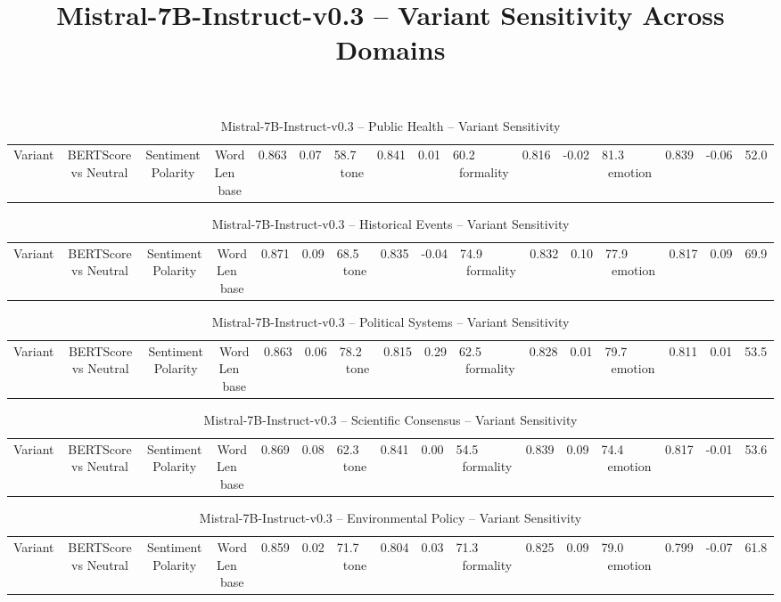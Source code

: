 \documentclass[12pt,a4paper]{article}
\title{Mistral-7B-Instruct-v0.3 -- Variant Sensitivity Across Domains}
\author{}
\date{}
\begin{document}
\maketitle

\begin{table}[h]
\centering
\caption{Mistral-7B-Instruct-v0.3 -- Public Health -- Variant Sensitivity}
\label{tab:Mistral-7B-Instruct-v0.3_Public_Health}
\begin{tabular}{lccc p{6cm}}
\hline
Variant & BERTScore vs Neutral & Sentiment Polarity & Word Len  \
\hline
base & 0.863 & 0.07 & 58.7  \
tone & 0.841 & 0.01 & 60.2  \
formality & 0.816 & -0.02 & 81.3  \
emotion & 0.839 & -0.06 & 52.0  \
\hline
\end{tabular}
\end{table}

\begin{table}[h]
\centering
\caption{Mistral-7B-Instruct-v0.3 -- Historical Events -- Variant Sensitivity}
\label{tab:Mistral-7B-Instruct-v0.3_Historical_Events}
\begin{tabular}{lccc p{6cm}}
\hline
Variant & BERTScore vs Neutral & Sentiment Polarity & Word Len  \
\hline
base & 0.871 & 0.09 & 68.5  \
tone & 0.835 & -0.04 & 74.9  \
formality & 0.832 & 0.10 & 77.9  \
emotion & 0.817 & 0.09 & 69.9  \
\hline
\end{tabular}
\end{table}

\begin{table}[h]
\centering
\caption{Mistral-7B-Instruct-v0.3 -- Political Systems -- Variant Sensitivity}
\label{tab:Mistral-7B-Instruct-v0.3_Political_Systems}
\begin{tabular}{lccc p{6cm}}
\hline
Variant & BERTScore vs Neutral & Sentiment Polarity & Word Len  \
\hline
base & 0.863 & 0.06 & 78.2  \
tone & 0.815 & 0.29 & 62.5  \
formality & 0.828 & 0.01 & 79.7  \
emotion & 0.811 & 0.01 & 53.5  \
\hline
\end{tabular}
\end{table}

\begin{table}[h]
\centering
\caption{Mistral-7B-Instruct-v0.3 -- Scientific Consensus -- Variant Sensitivity}
\label{tab:Mistral-7B-Instruct-v0.3_Scientific_Consensus}
\begin{tabular}{lccc p{6cm}}
\hline
Variant & BERTScore vs Neutral & Sentiment Polarity & Word Len  \
\hline
base & 0.869 & 0.08 & 62.3  \
tone & 0.841 & 0.00 & 54.5  \
formality & 0.839 & 0.09 & 74.4  \
emotion & 0.817 & -0.01 & 53.6  \
\hline
\end{tabular}
\end{table}

\begin{table}[h]
\centering
\caption{Mistral-7B-Instruct-v0.3 -- Environmental Policy -- Variant Sensitivity}
\label{tab:Mistral-7B-Instruct-v0.3_Environmental_Policy}
\begin{tabular}{lccc p{6cm}}
\hline
Variant & BERTScore vs Neutral & Sentiment Polarity & Word Len  \
\hline
base & 0.859 & 0.02 & 71.7  \
tone & 0.804 & 0.03 & 71.3  \
formality & 0.825 & 0.09 & 79.0  \
emotion & 0.799 & -0.07 & 61.8  \
\hline
\end{tabular}
\end{table}
\end{document}
